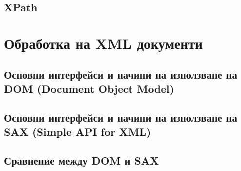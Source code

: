\documentclass[fleqn,12pt]{article}
\begin{document}
\subsection{XPath}

\section{Обработка на XML документи}

\subsection{Основни интерфейси и начини на използване на DOM (Document Object Model)}
\subsection{Основни интерфейси и начини на използване на SAX (Simple API for XML)}
\subsection{Сравнение между DOM и SAX}
\end{document}
